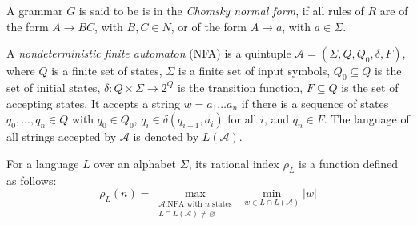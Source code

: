 \documentclass[runningheads]{llncs}
\renewcommand{\emptyset}{\varnothing}
\begin{document}
A grammar $G$ is said to be is in the \textit{Chomsky normal form},
if all rules of $R$ are of the form
$A \to BC$, with $B, C \in N$, or of the form $A \to a$, with $a \in \Sigma$. 

A \textit{nondeterministic finite automaton} (NFA) is a quintuple
$\mathcal{A}=(\Sigma, Q, Q_0, \delta, F)$, where $Q$ is a finite set of states,
$\Sigma$ is a finite set of input symbols,
$Q_0 \subseteq Q$ is the set of initial states,
$\delta \colon Q \times \Sigma \to 2^Q$ is the transition function,
$F \subseteq Q$ is the set of accepting states.
It accepts a string $w=a_1 \ldots a_n$ if there is a sequence of states $q_0, \ldots, q_n \in Q$
with $q_0 \in Q_0$, $q_i \in \delta(q_{i-1}, a_i)$ for all $i$, and $q_n \in F$.
The language of all strings accepted by $\mathcal{A}$ is denoted by $L(\mathcal{A})$.

For a language $L$ over an alphabet $\Sigma$,
its rational index $\rho_L$ is a function defined as follows:
\begin{equation*}
	\rho_L(n)
		=
	\max_{\substack{\mathcal{A} \text{:NFA with }n\text{ states} \\ L \cap L(\mathcal{A}) \neq \emptyset}}
	\;
	\min_{w \in L \cap L(\mathcal{A})}|w|
\end{equation*}
\end{document}
